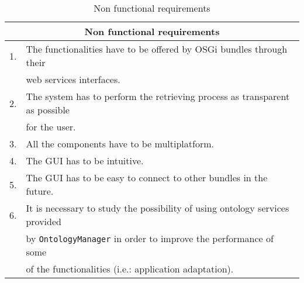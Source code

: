 \begin{table}[h!]
	\small
    \begin{center}
		\begin{tabular}{||r|l||}
		\hline \hline
		\multicolumn{2}{||c||}{\bfseries{Non functional requirements}} \\
		\hline \hline
			1. & The functionalities have to be offered by OSGi bundles through
			their  \\
			& web services interfaces. \\
			\hline
			2. & The system has to perform the retrieving process as transparent
			 as possible \\
			& for the user. \\
			\hline
			3. & All the components have to be multiplatform. \\
			\hline
			4. & The GUI has to be intuitive.\\
			\hline
			5. & The GUI has to be easy to connect to other bundles in the future.\\
			\hline
		 	6. & It is necessary to study the possibility of using ontology services
		 	provided\\
		 	& by \verb|OntologyManager| in order to improve the performance of some\\
		 	& of the functionalities (i.e.: application adaptation).\\
		
		\hline \hline
		\end{tabular}
		\caption{\label{table:non-functional-requirements}Non functional requirements}
	\end{center}
\end{table}